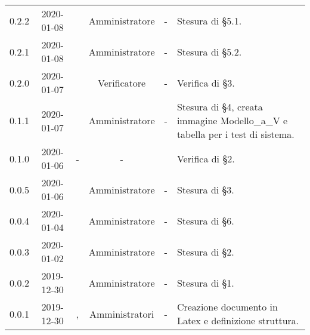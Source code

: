 {\begin{longtable}{ c c  C{2.3cm} c C{3cm} C{3.2cm}}
0.2.2 & 2020-01-08 & \MC{} & Amministratore & - & Stesura di §5.1. \\
0.2.1 & 2020-01-08 & \AT{} & Amministratore & - & Stesura di §5.2. \\
0.2.0 & 2020-01-07 & \DF{} & Verificatore & - & Verifica di §3. \\
0.1.1 & 2020-01-07 & \AT{} & Amministratore & - & Stesura di §4, creata immagine Modello\_a\_V e tabella per i test di sistema. \\
0.1.0 & 2020-01-06 & - & - & \LD{} & Verifica di §2. \\
0.0.5 & 2020-01-06 & \BR{} & Amministratore & - & Stesura di §3. \\
0.0.4 & 2020-01-04 & \MC{} & Amministratore & - & Stesura di §6. \\
0.0.3 & 2020-01-02 & \MC{} & Amministratore & - & Stesura di §2. \\
0.0.2 & 2019-12-30 & \AT{} & Amministratore & - & Stesura di §1. \\
0.0.1 & 2019-12-30 & \AT{}, \MC{} & Amministratori & - & Creazione documento in Latex e definizione struttura. \\

\end{longtable}
}
